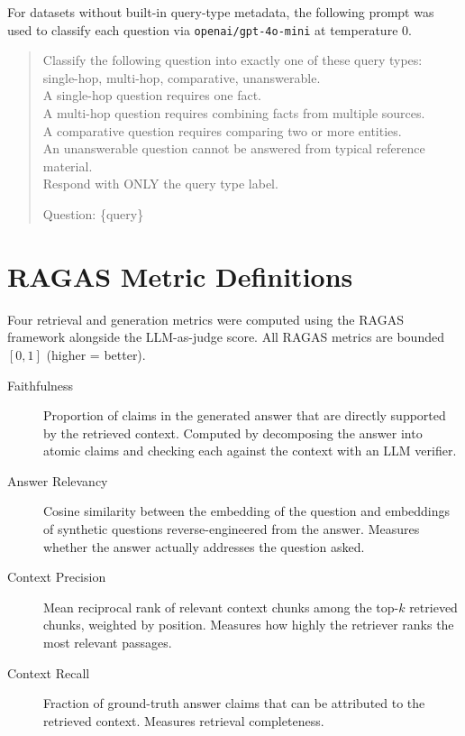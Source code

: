 For datasets without built-in query-type metadata, the following prompt was used
to classify each question via \texttt{openai/gpt-4o-mini} at temperature 0.

\begin{quote}
\small\ttfamily\sloppy
Classify the following question into exactly one of these query types:\\
single-hop, multi-hop, comparative, unanswerable.\\
A single-hop question requires one fact.\\
A multi-hop question requires combining facts from multiple sources.\\
A comparative question requires comparing two or more entities.\\
An unanswerable question cannot be answered from typical reference material.\\
Respond with ONLY the query type label.

\medskip
Question: \{query\}
\end{quote}

\section{RAGAS Metric Definitions}
\label{app:ragas}

Four retrieval and generation metrics were computed using the RAGAS
framework \cite{ragas2023} alongside the LLM-as-judge score. All RAGAS
metrics are bounded $[0, 1]$ (higher = better).

\begin{description}
  \item[Faithfulness] Proportion of claims in the generated answer that are
    directly supported by the retrieved context. Computed by decomposing the
    answer into atomic claims and checking each against the context with an LLM
    verifier.
  \item[Answer Relevancy] Cosine similarity between the embedding of the
    question and embeddings of synthetic questions reverse-engineered from the
    answer. Measures whether the answer actually addresses the question asked.
  \item[Context Precision] Mean reciprocal rank of relevant context chunks
    among the top-$k$ retrieved chunks, weighted by position. Measures how
    highly the retriever ranks the most relevant passages.
  \item[Context Recall] Fraction of ground-truth answer claims that can be
    attributed to the retrieved context. Measures retrieval completeness.
\end{description}

